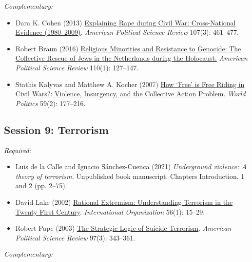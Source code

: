 \documentclass[12pt, a4paper]{article}
\begin{document}
\noindent\textit{Complementary:}

\begin{itemize}
	\item Dara K. Cohen (2013) \href{https://doi.org/10.1017/S0003055413000221}{Explaining Rape during Civil War: Cross-National Evidence (1980–2009)}. \textit{American Political Science Review} 107(3): 461--477.
  \item Robert Braun (2016) \href{https://doi.org/10.1017/S0003055415000544}{Religious Minorities and Resistance to Genocide: The Collective Rescue of Jews in the Netherlands during the Holocaust.} \textit{American Political Science Review} 110(1): 127--147.
  \item Stathis Kalyvas and Matthew A. Kocher (2007) \href{https://doi.org/10.1353/wp.2007.0023}{How `Free' is Free Riding in Civil Wars?: Violence, Insurgency, and the Collective Action Problem}. \textit{World Politics} 59(2): 177--216.
\end{itemize}

\vspace{20pt}
\hline
\subsection*{Session 9: Terrorism}

\noindent\textit{Required:}


\begin{itemize}
  \item Luis de la Calle and Ignacio Sánchez-Cuenca (2021) \textit{Underground violence: A theory of terrorism.} Unpublished book manuscript. Chapters Introduction, 1 and 2 (pp. 2--75).
	\item David Lake (2002) \href{https://doi.org/10.1017/S777777770200002X}{Rational Extremism: Understanding Terrorism in the Twenty First Century}. \textit{International Organization} 56(1): 15--29.
  \item Robert Pape (2003) \href{https://doi.org/10.1017/S000305540300073X}{The Strategic Logic of Suicide Terrorism}. \textit{American Political Science Review} 97(3): 343--361.
\end{itemize}

\noindent\textit{Complementary:}

\end{document}

